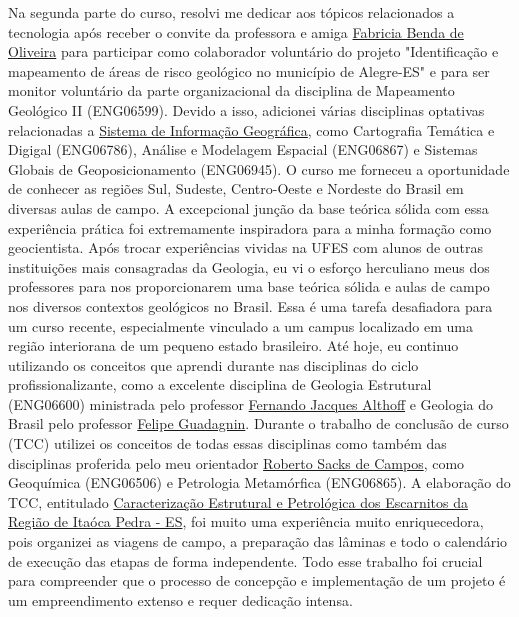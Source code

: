 \documentclass[10pt,a4paper,oneside]{book}
\begin{document}
Na segunda parte do curso, resolvi me dedicar aos tópicos relacionados a tecnologia após receber o convite da professora e amiga \href{http://lattes.cnpq.br/9513837515797451}{Fabricia Benda de Oliveira} para participar como colaborador voluntário do projeto "Identificação e mapeamento de áreas de risco geológico no município de Alegre-ES" e para ser monitor voluntário da parte organizacional da disciplina de Mapeamento Geológico II (ENG06599). Devido a isso, adicionei várias disciplinas optativas relacionadas a \href{https://www.gov.br/economia/pt-br/assuntos/patrimonio-da-uniao/arquivos-anteriores-privados/programa-de-modernizacao/linha-do-tempo/34-sig-apostila.pdf}{Sistema de Informação Geográfica}, como Cartografia Temática e Digigal (ENG06786), Análise e Modelagem Espacial  (ENG06867) e Sistemas Globais de Geoposicionamento (ENG06945). O curso me forneceu a oportunidade de conhecer as regiões Sul, Sudeste, Centro-Oeste e Nordeste do Brasil em diversas aulas de campo. A excepcional junção da base teórica sólida com essa experiência prática foi extremamente inspiradora para a minha formação como geocientista. Após trocar experiências vividas na UFES com alunos de outras instituições mais consagradas da Geologia, eu vi o esforço herculiano meus dos professores para nos proporcionarem uma base teórica sólida e aulas de campo nos diversos contextos geológicos no Brasil. Essa é uma tarefa desafiadora para um curso recente, especialmente vinculado a um campus localizado em uma região interiorana de um pequeno estado brasileiro. Até hoje, eu continuo utilizando os conceitos que aprendi durante nas disciplinas do ciclo profissionalizante, como a excelente disciplina de Geologia Estrutural (ENG06600) ministrada pelo professor \href{http://lattes.cnpq.br/1004206862799097}{Fernando Jacques Althoff} e Geologia do Brasil pelo professor \href{http://lattes.cnpq.br/5883057974133630}{Felipe Guadagnin}. Durante o trabalho de conclusão de curso (TCC) utilizei os conceitos de todas essas disciplinas como também das disciplinas proferida pelo meu orientador \href{http://lattes.cnpq.br/5081674111092263}{Roberto Sacks de Campos}, como Geoquímica (ENG06506) e Petrologia Metamórfica (ENG06865). A elaboração do TCC, entitulado \href{https://doi.org/10.6084/m9.figshare.25366483.v1}{Caracterização Estrutural e Petrológica dos Escarnitos da Região de Itaóca Pedra - ES}, foi muito uma experiência muito enriquecedora, pois organizei as viagens de campo, a preparação das lâminas e todo o calendário de execução das etapas de forma independente. Todo esse trabalho foi crucial para compreender que o processo de concepção e implementação de um projeto é um empreendimento extenso e requer dedicação intensa.
\end{document}
